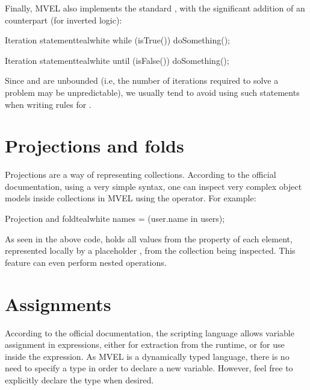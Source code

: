 Finally, MVEL also implements the standard , with the significant addition of an  counterpart (for inverted logic):

\begin{codebox}{Iteration statement}{teal}{\icnote}{white}
while (isTrue()) {
   doSomething();
}
\end{codebox}

\begin{codebox}{Iteration statement}{teal}{\icnote}{white}
until (isFalse()) {
   doSomething();
}
\end{codebox}

Since  and  are unbounded (i.e, the number of iterations required to solve a problem may be unpredictable), we usually tend to avoid using such statements when writing rules for \arara.

\section{Projections and folds}
\label{sec:mvelprojectionsandfolds}

Projections are a way of representing collections. According to the official documentation, using a very simple syntax, one can inspect very complex object models inside collections in MVEL using the  operator. For example:

\begin{codebox}{Projection and fold}{teal}{\icnote}{white}
names = (user.name in users);
\end{codebox}

As seen in the above code,  holds all values from the  property of each element, represented locally by a placeholder , from the collection  being inspected. This feature can even perform nested operations.

\section{Assignments}
\label{sec:mvelassignments}

According to the official documentation, the scripting language allows variable assignment in expressions, either for extraction from the runtime, or for use inside the expression. As MVEL is a dynamically typed language, there is no need to specify a type in order to declare a new variable. However, feel free to explicitly declare the type when desired.


